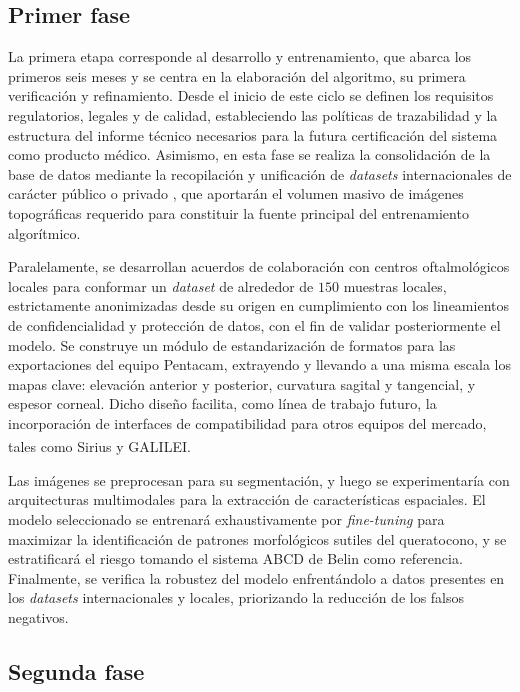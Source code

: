     \subsection*{Primer fase}
        
        La primera etapa corresponde al desarrollo y entrenamiento, que abarca los primeros seis meses y se centra en la elaboración del algoritmo, su primera verificación y refinamiento. Desde el inicio de este ciclo se definen los requisitos regulatorios, legales y de calidad, estableciendo las políticas de trazabilidad y la estructura del informe técnico necesarios para la futura certificación del sistema como producto médico. Asimismo, en esta fase se realiza la consolidación de la base de datos mediante la recopilación y unificación de \textit{datasets} internacionales de carácter público o privado , que aportarán el volumen masivo de imágenes topográficas requerido para constituir la fuente principal del entrenamiento algorítmico. 
    
        Paralelamente, se desarrollan acuerdos de colaboración con centros oftalmológicos locales para conformar un \textit{dataset} de alrededor de $150$ muestras locales, estrictamente anonimizadas desde su origen en cumplimiento con los lineamientos de confidencialidad y protección de datos, con el fin de validar posteriormente el modelo. Se construye un módulo de estandarización de formatos para las exportaciones del equipo Pentacam, extrayendo y llevando a una misma escala los mapas clave: elevación anterior y posterior, curvatura sagital y tangencial, y espesor corneal. Dicho diseño facilita, como línea de trabajo futuro, la incorporación de interfaces de compatibilidad para otros equipos del mercado, tales como Sirius y GALILEI\textsuperscript{\textregistered}. 
    
        Las imágenes se preprocesan para su segmentación, y luego se experimentaría con arquitecturas multimodales para la extracción de características espaciales. El modelo seleccionado se entrenará exhaustivamente por \textit{fine-tuning} para maximizar la identificación de patrones morfológicos sutiles del queratocono, y se estratificará el riesgo tomando el sistema ABCD de Belin como referencia. Finalmente, se verifica la robustez del modelo enfrentándolo a datos presentes en los \textit{datasets} internacionales y locales, priorizando la reducción de los falsos negativos.

     \subsection*{Segunda fase}
        
